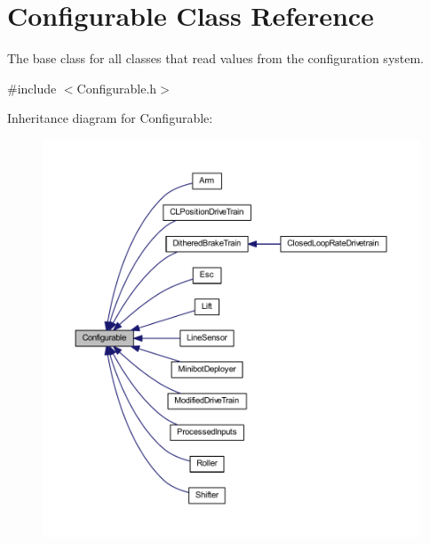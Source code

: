 \hypertarget{class_configurable}{
\section{\-Configurable \-Class \-Reference}
\label{class_configurable}
}


\-The base class for all classes that read values from the configuration system.  




{\ttfamily \#include $<$\-Configurable.\-h$>$}



\-Inheritance diagram for \-Configurable\-:
\nopagebreak
\begin{figure}[H]
\begin{center}
\leavevmode
\includegraphics[width=350pt]{class_configurable__inherit__graph}
\end{center}
\end{figure}

